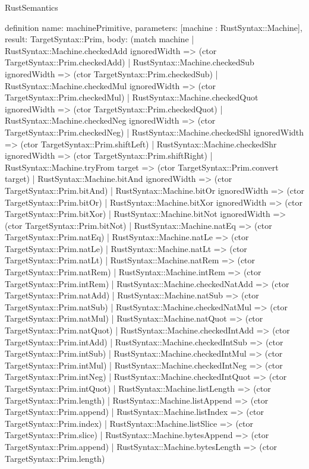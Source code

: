 \begin{lexlean}{RustSemantics}
\begin{semanticmodule}
definition{
  name: machinePrimitive,
  parameters: [machine : RustSyntax::Machine],
  result: TargetSyntax::Prim,
  body: (match machine
    | RustSyntax::Machine.checkedAdd ignoredWidth => (ctor TargetSyntax::Prim.checkedAdd)
    | RustSyntax::Machine.checkedSub ignoredWidth => (ctor TargetSyntax::Prim.checkedSub)
    | RustSyntax::Machine.checkedMul ignoredWidth => (ctor TargetSyntax::Prim.checkedMul)
    | RustSyntax::Machine.checkedQuot ignoredWidth => (ctor TargetSyntax::Prim.checkedQuot)
    | RustSyntax::Machine.checkedNeg ignoredWidth => (ctor TargetSyntax::Prim.checkedNeg)
    | RustSyntax::Machine.checkedShl ignoredWidth => (ctor TargetSyntax::Prim.shiftLeft)
    | RustSyntax::Machine.checkedShr ignoredWidth => (ctor TargetSyntax::Prim.shiftRight)
    | RustSyntax::Machine.tryFrom target => (ctor TargetSyntax::Prim.convert target)
    | RustSyntax::Machine.bitAnd ignoredWidth => (ctor TargetSyntax::Prim.bitAnd)
    | RustSyntax::Machine.bitOr ignoredWidth => (ctor TargetSyntax::Prim.bitOr)
    | RustSyntax::Machine.bitXor ignoredWidth => (ctor TargetSyntax::Prim.bitXor)
    | RustSyntax::Machine.bitNot ignoredWidth => (ctor TargetSyntax::Prim.bitNot)
    | RustSyntax::Machine.natEq => (ctor TargetSyntax::Prim.natEq)
    | RustSyntax::Machine.natLe => (ctor TargetSyntax::Prim.natLe)
    | RustSyntax::Machine.natLt => (ctor TargetSyntax::Prim.natLt)
    | RustSyntax::Machine.natRem => (ctor TargetSyntax::Prim.natRem)
    | RustSyntax::Machine.intRem => (ctor TargetSyntax::Prim.intRem)
    | RustSyntax::Machine.checkedNatAdd => (ctor TargetSyntax::Prim.natAdd)
    | RustSyntax::Machine.natSub => (ctor TargetSyntax::Prim.natSub)
    | RustSyntax::Machine.checkedNatMul => (ctor TargetSyntax::Prim.natMul)
    | RustSyntax::Machine.natQuot => (ctor TargetSyntax::Prim.natQuot)
    | RustSyntax::Machine.checkedIntAdd => (ctor TargetSyntax::Prim.intAdd)
    | RustSyntax::Machine.checkedIntSub => (ctor TargetSyntax::Prim.intSub)
    | RustSyntax::Machine.checkedIntMul => (ctor TargetSyntax::Prim.intMul)
    | RustSyntax::Machine.checkedIntNeg => (ctor TargetSyntax::Prim.intNeg)
    | RustSyntax::Machine.checkedIntQuot => (ctor TargetSyntax::Prim.intQuot)
    | RustSyntax::Machine.listLength => (ctor TargetSyntax::Prim.length)
    | RustSyntax::Machine.listAppend => (ctor TargetSyntax::Prim.append)
    | RustSyntax::Machine.listIndex => (ctor TargetSyntax::Prim.index)
    | RustSyntax::Machine.listSlice => (ctor TargetSyntax::Prim.slice)
    | RustSyntax::Machine.bytesAppend => (ctor TargetSyntax::Prim.append)
    | RustSyntax::Machine.bytesLength => (ctor TargetSyntax::Prim.length)
}
\end{semanticmodule}
\end{lexlean}
